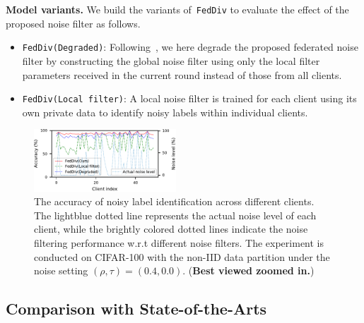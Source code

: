 \documentclass[letterpaper]{article} %
\begin{document}
\noindent
\textbf{Model variants.}
We build the variants of~\texttt{FedDiv} to evaluate the effect of the proposed noise filter as follows.

\begin{itemize}

    \item \texttt{FedDiv(Degraded)}: Following~\cite{fedgmm2022}, we here degrade the proposed federated noise filter by constructing the global noise filter using only the local filter parameters received in the current round instead of those from all clients.

    \item \texttt{FedDiv(Local filter)}: A local noise filter is trained for each client using its own private data to identify noisy labels within individual clients.

\end{itemize}

\begin{figure}[t]
    \centering

    \includegraphics[width=0.475\textwidth]{figures/filtering_accuracy.pdf}

    \caption{The accuracy of noisy label identification across different clients. The lightblue dotted line represents the actual noise level of each client, while the brightly colored dotted lines indicate the noise filtering performance w.r.t different noise filters. The experiment is conducted on CIFAR-100 with the non-IID data partition under the noise setting $(\rho, \tau)=(0.4, 0.0)$. (\textbf{Best viewed zoomed in.})}
    \label{Figure:Filtering-Accuracy-per-Method}

\end{figure}

\subsection{Comparison with State-of-the-Arts}
\end{document}
